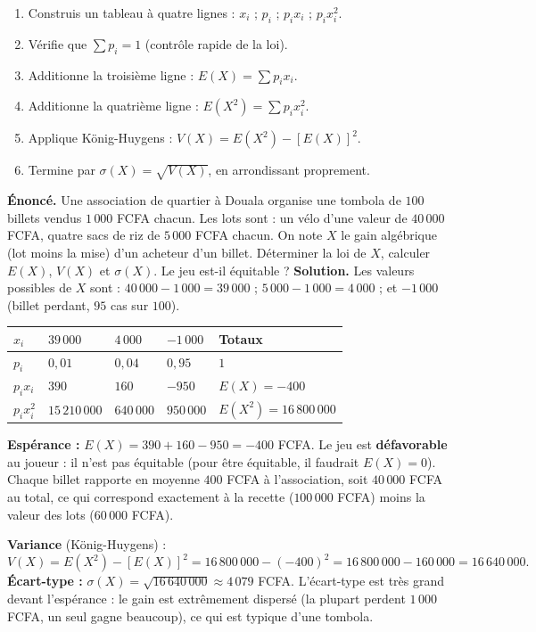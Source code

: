 \documentclass[11pt]{article}
\begin{document}
\begin{methode}
\begin{enumerate}
\item Construis un tableau à quatre lignes : $x_i$ ; $p_i$ ; $p_i x_i$ ; $p_i x_i^2$.
\item Vérifie que $\sum p_i = 1$ (contrôle rapide de la loi).
\item Additionne la troisième ligne : $E(X) = \sum p_i x_i$.
\item Additionne la quatrième ligne : $E(X^2) = \sum p_i x_i^2$.
\item Applique König-Huygens : $V(X) = E(X^2) - [E(X)]^2$.
\item Termine par $\sigma(X) = \sqrt{V(X)}$, en arrondissant proprement.
\end{enumerate}
\end{methode}

\begin{exoresolu}
\textbf{Énoncé.} Une association de quartier à Douala organise une tombola de $100$ billets vendus $1\,000$ FCFA chacun. Les lots sont : un vélo d'une valeur de $40\,000$ FCFA, quatre sacs de riz de $5\,000$ FCFA chacun. On note $X$ le gain algébrique (lot moins la mise) d'un acheteur d'un billet. Déterminer la loi de $X$, calculer $E(X)$, $V(X)$ et $\sigma(X)$. Le jeu est-il équitable ?
\tcblower
\textbf{Solution.} Les valeurs possibles de $X$ sont : $40\,000 - 1\,000 = 39\,000$ ; $5\,000 - 1\,000 = 4\,000$ ; et $-1\,000$ (billet perdant, $95$ cas sur $100$).
\begin{center}
\begin{tabularx}{\linewidth}{|l|X|X|X|X|}
\hline
\rowcolor{popblueL} $x_i$ & $39\,000$ & $4\,000$ & $-1\,000$ & \textbf{Totaux} \\
\hline
$p_i$ & $0{,}01$ & $0{,}04$ & $0{,}95$ & $1$ \\
\hline
$p_i x_i$ & $390$ & $160$ & $-950$ & $E(X) = -400$ \\
\hline
$p_i x_i^2$ & $15\,210\,000$ & $640\,000$ & $950\,000$ & $E(X^2) = 16\,800\,000$ \\
\hline
\end{tabularx}
\end{center}
\textbf{Espérance :} $E(X) = 390 + 160 - 950 = -400$ FCFA. Le jeu est \textbf{défavorable} au joueur : il n'est pas équitable (pour être équitable, il faudrait $E(X) = 0$). Chaque billet rapporte en moyenne $400$ FCFA à l'association, soit $40\,000$ FCFA au total, ce qui correspond exactement à la recette ($100\,000$ FCFA) moins la valeur des lots ($60\,000$ FCFA).

\textbf{Variance} (König-Huygens) :
\[ V(X) = E(X^2) - [E(X)]^2 = 16\,800\,000 - (-400)^2 = 16\,800\,000 - 160\,000 = 16\,640\,000. \]
\textbf{Écart-type :} $\sigma(X) = \sqrt{16\,640\,000} \approx 4\,079$ FCFA. L'écart-type est très grand devant l'espérance : le gain est extrêmement dispersé (la plupart perdent $1\,000$ FCFA, un seul gagne beaucoup), ce qui est typique d'une tombola.
\end{exoresolu}
\end{document}
